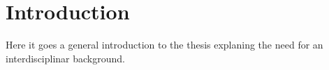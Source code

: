 \chapter{Introduction}
Here it goes a general introduction to the thesis explaning the need for an interdisciplinar background.